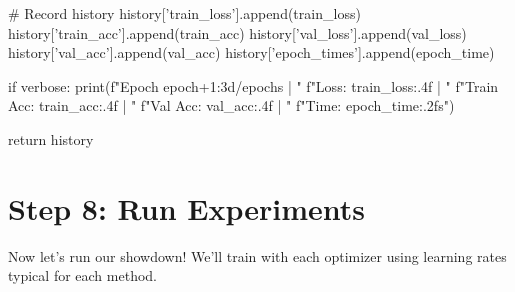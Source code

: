 \documentclass[../../main.tex]{subfiles}
\begin{document}
\begin{pythoncode}
        # Record history
        history['train_loss'].append(train_loss)
        history['train_acc'].append(train_acc)
        history['val_loss'].append(val_loss)
        history['val_acc'].append(val_acc)
        history['epoch_times'].append(epoch_time)

        if verbose:
            print(f"Epoch {epoch+1:3d}/{epochs} | "
                  f"Loss: {train_loss:.4f} | "
                  f"Train Acc: {train_acc:.4f} | "
                  f"Val Acc: {val_acc:.4f} | "
                  f"Time: {epoch_time:.2f}s")

    return history
\end{pythoncode}

\section{Step 8: Run Experiments}
\label{sec:capstone-experiments}

Now let's run our showdown! We'll train with each optimizer using learning rates typical for each method.
\end{document}
